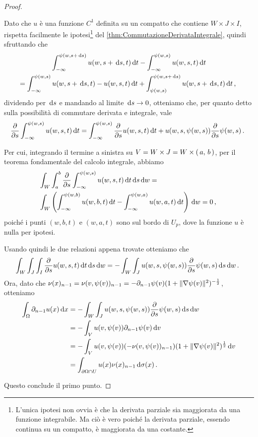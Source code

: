 \begin{proof}
\begin{description}
			Dato che $u$ è una funzione $C^1$ definita su un compatto che contiene $W\times J\times I$, rispetta facilmente le ipotesi\footnote{L'unica ipotesi non ovvia è che la derivata parziale sia maggiorata da una funzione integrabile. Ma ciò è vero poiché la derivata parziale, essendo continua su un compatto, è maggiorata da una costante.} del \cref{thm:CommutazioneDerivataIntegrale}, quindi sfruttando che
			\begin{multline*}
				 \int_{-\infty}^{\psi(w,s+\,\mathrm d s)} u(w,s+\,\mathrm d s,t) \,\mathrm d t- \int_{-\infty}^{\psi(w,s)} u(w,s,t) \,\mathrm d t\\ =\int_{-\infty}^{\psi(w,s)} u(w,s+\,\mathrm d s,t)- u(w,s,t) \,\mathrm d t+  \int_{\psi(w,s)}^{\psi(w,s+\,\mathrm d s)} u(w,s+\,\mathrm d s,t) \,\mathrm d t\, \text{, }
			\end{multline*}
			dividendo per $\,\mathrm d s$ e mandando al limite $\,\mathrm d s\to 0$, otteniamo che, per quanto detto sulla possibilità di commutare derivata e integrale, vale
			\begin{equation*}
				\frac{\partial}{\partial s} \int_{-\infty}^{\psi(w,s)} u(w,s,t) \,\mathrm d t =
				\int_{-\infty}^{\psi(w,s)} \frac\partial{\partial s} u(w,s,t) \,\mathrm d t + u(w,s,\psi(w,s))\frac\partial{\partial s} \psi (w,s)\, \text{. }
			\end{equation*}
			
			Per cui, integrando il termine a sinistra su $V=W\times J=W\times \left(\,a,\,b\,\right)$, per il teorema fondamentale del
			calcolo integrale, abbiamo 
			\begin{align*}
				&\int_W \int_a^b \frac\partial{\partial s} \int_{-\infty}^{\psi(w,s)} u(w,s,t) \,\mathrm d t \,\mathrm d s \,\mathrm d w = \\
				&\int_W \left(\int_{-\infty}^{\psi(w,b)} u(w,b,t) \,\mathrm d t - \int_{-\infty}^{\psi(w,a)} u(w,a,t) \,\mathrm d t\right) \,\mathrm d w
				= 0\, \text{, }
			\end{align*}
			poiché i punti $(w,b,t)$ e $(w,a,t)$ sono sul bordo di $U_p$, dove la funzione $u$ è nulla per ipotesi. 
			
			Usando quindi le due relazioni appena trovate otteniamo che
			\[
				\int_W\int_J\int_I\frac\partial{\partial s} u(w,s,t) \,\mathrm d t \,\mathrm d s \,\mathrm d w =-\int_W \int_J u(w,s,\psi(w,s))\frac\partial{\partial s} \psi (w,s)\,\mathrm d s\,\mathrm d w\, \text{. }
			\]
			Ora, dato che $\nu(x)_{n-1}=\nu(v,\psi(v))_{n-1}=-\partial_{n-1}\psi(v)(1+\lVert\nabla\psi(v)\rVert^2)^{-\frac{1}{2}}$, otteniamo
			\begin{align*}
				\int_{\Omega} \partial_{n-1} u(x) \,\mathrm d x & = -\int_W \int_J u(w,s,\psi(w,s))\frac\partial{\partial s} \psi (w,s) \,\mathrm d s \,\mathrm d w\\
				& = -\int_V u(v,\psi(v))\partial_{n-1} \psi(v) \,\mathrm d v\\
				& = -\int_V u(v,\psi(v))(-\nu(v,\psi(v))_{n-1})(1+\lVert\nabla\psi(v)\rVert^2)^{\frac{1}{2}} \,\mathrm d v\\
				& = \int_{\partial \Omega \cap U} u(x)\nu(x)_{n-1} \,\mathrm d \sigma(x)\, \text{. }
			\end{align*}
	\end{description}
	Questo conclude il primo punto.
	

\end{proof}
